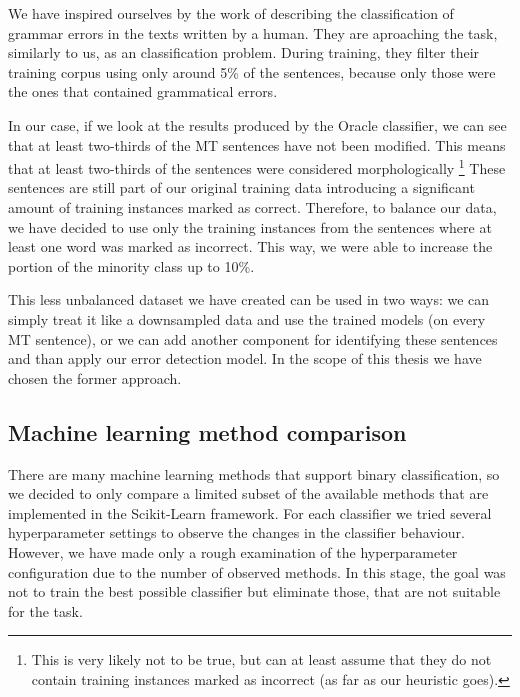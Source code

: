 We have inspired ourselves by the work of \citet{2013_Jia_CoNLL_GrammaticalError} describing the classification of grammar errors in the texts
written by a human. They are aproaching the task, similarly to us, as an classification
problem. During training, they filter their training corpus using only around 5\% of
the sentences, because only those were the ones that contained grammatical errors.

In our case, if we look at the results produced by the Oracle classifier, we can see that at least
two-thirds of the MT sentences have not been modified. This means that at least two-thirds of the sentences
were considered morphologically \footnote{This is very likely not to be true, but can at least assume
that they do not contain training instances marked as incorrect (as far as our heuristic goes).}
These sentences are still part of our original training data introducing a significant amount of training
instances marked as correct.
Therefore, to balance our data, we have decided to use only the training
instances from the sentences where at least one word was marked as incorrect. This way, we were
able to increase the portion of the minority class up to 10\%.

This less unbalanced dataset we have created can be used in two ways: we can simply treat
it like a downsampled data and use the trained models  (on every MT sentence),
or we can add another component for identifying these  sentences
and than apply our error detection model. In the scope of this thesis we have chosen the former
approach.



\subsection{Machine learning method comparison}

There are many machine learning methods that support binary classification, so we
decided to only compare a limited subset of the available methods that are implemented
in the Scikit-Learn framework. For each classifier we tried several hyperparameter
settings to observe the changes in the classifier behaviour. However, we have made only
a rough examination of the hyperparameter configuration due to the number of observed
methods. In this stage, the goal was not to train the best possible classifier but
eliminate those, that are not suitable for the task.

